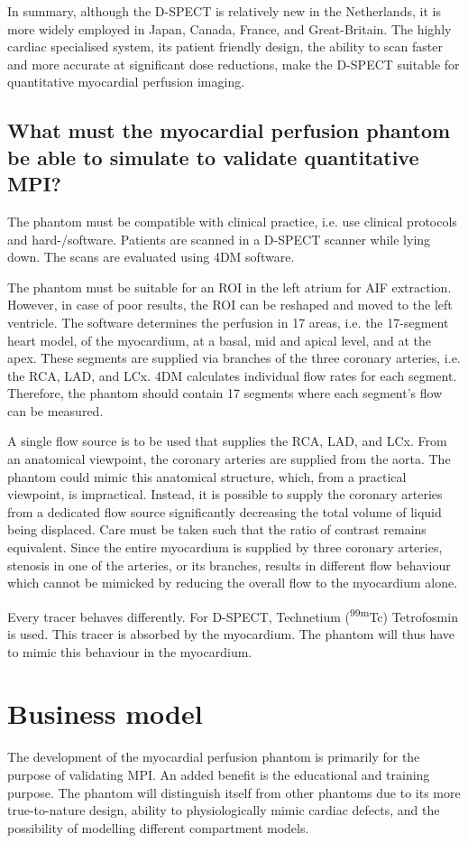 In summary, although the D-SPECT is relatively new in the Netherlands, it is more widely employed in Japan, Canada, France, and Great-Britain. The highly cardiac specialised system, its patient friendly design, the ability to scan faster and more accurate at significant dose reductions, make the D-SPECT suitable for quantitative myocardial perfusion imaging. 

\subsection{What must the myocardial perfusion phantom be able to simulate to validate quantitative MPI?}
\label{sec:what_perf}
The phantom must be compatible with clinical practice, i.e. use clinical protocols and hard-/software. Patients are scanned in a D-SPECT scanner while lying down. The scans are evaluated using 4DM software. 

The phantom must be suitable for an ROI in the left atrium for \ac{AIF} extraction. However, in case of poor results, the ROI can be reshaped and moved to the left ventricle. The software determines the perfusion in 17 areas, i.e. the 17-segment heart model, of the myocardium, at a basal, mid and apical level, and at the apex. These segments are supplied via branches of the three coronary arteries, i.e. the RCA, LAD, and LCx. 4DM calculates individual flow rates for each segment. Therefore, the phantom should contain 17 segments where each segment's flow can be measured. 

A single flow source is to be used that supplies the RCA, LAD, and LCx. From an anatomical viewpoint, the coronary arteries are supplied from the aorta. The phantom could mimic this anatomical structure, which, from a practical viewpoint, is impractical. Instead, it is possible to supply the coronary arteries from a dedicated flow source significantly decreasing the total volume of liquid being displaced. Care must be taken such that the ratio of contrast remains equivalent. Since the entire myocardium is supplied by three coronary arteries, stenosis in one of the arteries, or its branches, results in different flow behaviour which cannot be mimicked by reducing the overall flow to the myocardium alone.

Every tracer behaves differently. For D-SPECT, Technetium (\textsuperscript{99m}Tc) Tetrofosmin is used. This tracer is absorbed by the myocardium. The phantom will thus have to mimic this behaviour in the myocardium.

\section{Business model}
The development of the myocardial perfusion phantom is primarily for the purpose of validating \ac{MPI}. An added benefit is the educational and training purpose. The phantom will distinguish itself from other phantoms due to its more true-to-nature design, ability to physiologically mimic cardiac defects, and the possibility of modelling different compartment models.

